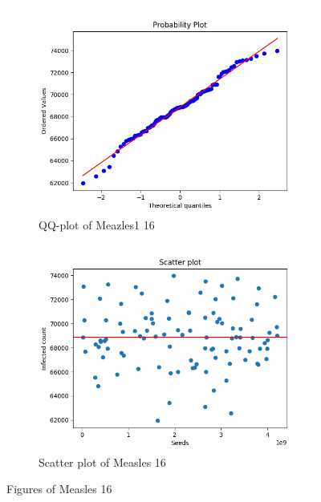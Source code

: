 \documentclass[a4paper]{article}
\begin{document}
\begin{figure}[H]
\begin{subfigure}{.5\textwidth}
  \centering
  \includegraphics[width=1\linewidth]
  {Measles_16/Measles_16-qqplot.png}
  \caption{QQ-plot of Meazles1 16}
  \label{fig:QQ-plot_Meazles_16}
\end{subfigure}%
\begin{subfigure}{.5\textwidth}
  \centering
  \includegraphics[width=1\linewidth]
  {Measles_16/Measles_16-scatterplot.png}
  \caption{Scatter plot of Measles 16}
  \label{fig:scatterplot_Meazles_16}
\end{subfigure}
\caption{Figures of Measles 16}
\label{fig:Meazles 16}
\end{figure}
\pagebreak
\end{document}
